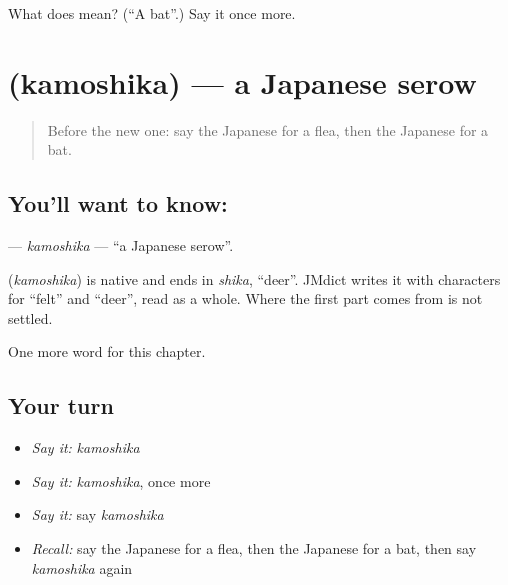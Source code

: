 \begin{tcolorbox}[breakable,colback=teal!4,colframe=teal!35!black,title={Before you move on}]
What does  mean? (\textquotedblleft{}A bat\textquotedblright{}.) Say it once more.
\end{tcolorbox}
\section[\texorpdfstring{\ja{かもしか} (kamoshika)}{かもしか (kamoshika)}]{ (kamoshika) — a Japanese serow}

\label{lesson:JA-C117-kamoshika}



\begin{quote}
Before the new one: say the Japanese for a flea, then the Japanese for a bat.
\end{quote}

\subsection*{You'll want to know: }
\textbf{} — \emph{kamoshika} — \textquotedblleft{}a Japanese serow\textquotedblright{}.

\begin{cousinweb}
\textbf{} (\emph{kamoshika}) is native and ends in \emph{shika}, \textquotedblleft{}deer\textquotedblright{}. JMdict writes it with characters for \textquotedblleft{}felt\textquotedblright{} and \textquotedblleft{}deer\textquotedblright{}, read as a whole. Where the first part comes from is not settled.
\end{cousinweb}

\begin{grammarlens}[title={What you've built}]
One more word for this chapter.
\end{grammarlens}

\subsection*{Your turn}
\begin{itemize}
\raggedright
  \item \emph{Say it:} \emph{kamoshika}
  \item \emph{Say it:} \emph{kamoshika}, once more
  \item \emph{Say it:} say \emph{kamoshika}
  \item \emph{Recall:} say the Japanese for a flea, then the Japanese for a bat, then say \emph{kamoshika} again
\end{itemize}

